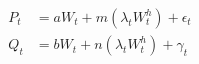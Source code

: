 \begin{align*}
	P_{t}&=aW_{t}+m(\lambda_{t}W_{t}^{h})+\epsilon_{t}\\
	Q_{t}&=bW_{t}+n(\lambda_{t}W_{t}^{h})+\gamma_{t}
\end{align*}